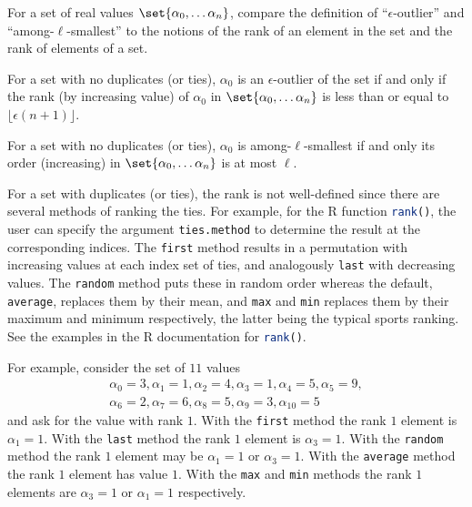 \documentclass[12pt]{article}
\begin{document}
\begin{exercise}
    For a set of real values \( \set{\alpha_0, \dots \alpha_n} \),
    compare the definition of ``\( \epsilon \)-outlier'' and ``among-\(
    \ell \)-smallest'' to the notions of the rank of an element in the
    set and the rank of elements of a set.
\end{exercise}
\begin{solution}
    For a set with no duplicates (or ties), \( \alpha_0 \) is an \(
    \epsilon \)-outlier of the set if and only if the rank (by
    increasing value) of \( \alpha_0 \) in \( \set{\alpha_0, \dots
    \alpha_n} \) is less than or equal to \( \lfloor \epsilon(n+1)
    \rfloor \).

    For a set with no duplicates (or ties), \( \alpha_0 \) is among-\(
    \ell \)-smallest if and only its order (increasing) in \( \set{\alpha_0,
    \dots \alpha_n} \) is at most \( \ell \).

    For a set with duplicates (or ties), the rank is not well-defined
    since there are several methods of ranking the ties.  For example,
    for the R function \lstinline[language=R]{rank()}, the user can specify the
    argument \lstinline[language=R]{ties.method} to determine the result at the
    corresponding indices.  The \lstinline[language=R]{first} method results in a
    permutation with increasing values at each index set of ties, and
    analogously \lstinline[language=R]{last} with decreasing values.  The \lstinline[language=R]{random}
    method puts these in random order whereas the default, \lstinline[language=R]{average},
    replaces them by their mean, and \lstinline[language=R]{max} and \lstinline[language=R]{min}
    replaces them by their maximum and minimum respectively, the latter
    being the typical sports ranking.  See the examples in the R
    documentation for \lstinline[language=R]{rank()}.

    For example, consider the set of \( 11 \) values
    \begin{multline*}
        \alpha_0 = 3, \alpha_1 = 1, \alpha_2 = 4, \alpha_3 = 1, \alpha_4
        = 5, \alpha_5 = 9, \\
        \alpha_6 = 2, \alpha_7 = 6, \alpha_8 = 5, \alpha_9 = 3, \alpha_
        {10} = 5
    \end{multline*}
    and ask for the value with rank \( 1 \).  With the \lstinline[language=R]{first}
    method the rank \( 1 \) element is \( \alpha_1 = 1 \).  With the
   \lstinline[language=R]{last} method the rank \( 1 \) element is \( \alpha_3 = 1 \).
    With the \lstinline[language=R]{random} method the rank \( 1 \) element may
    be \( \alpha_1 = 1 \) or \( \alpha_3 = 1 \).  With the \lstinline[language=R]{average}
    method the rank \( 1 \) element has value \( 1 \).  With the
    \lstinline[language=R]{max} and \lstinline[language=R]{min} methods the rank \( 1 \) elements are \(
    \alpha_3 = 1 \) or \( \alpha_1 = 1 \) respectively.


\end{solution}
\end{document}
